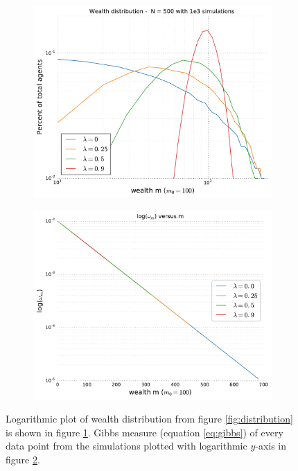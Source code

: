 \documentclass[10pt, a4paper]{amsart}
\begin{document}
\begin{figure}
\begin{subfigure}{.5\textwidth}
  \centering
  \includegraphics[width=\textwidth]{../figures/5ac/5cLOGLOG_N500_varSavings.pdf}
  \caption{}
  \label{fig:logdistribution}
\end{subfigure}%
\begin{subfigure}{.5\textwidth}
  \centering
  \includegraphics[width=\linewidth]{../figures/5ac/omega.pdf}
  \caption{}
  \label{fig:straightline}
\end{subfigure}
\caption{Logarithmic plot of wealth distribution from figure \ref{fig:distribution} is shown in figure \ref{fig:logdistribution}. Gibbs measure (equation \ref{eq:gibbs}) of every data point from the simulations plotted with logarithmic $y$-axis in figure \ref{fig:straightline}.}
\label{fig:logplot}
\end{figure}
\end{document}
